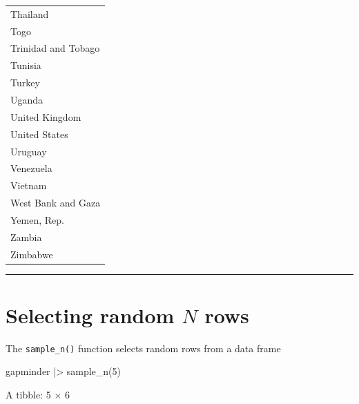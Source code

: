 \documentclass[
  letterpaper,
  DIV=11,
  numbers=noendperiod]{scrreprt}
\newenvironment{Shaded}{\begin{snugshade}}{\end{snugshade}}
\newcommand{\DecValTok}[1]{\textcolor[rgb]{0.68,0.00,0.00}{#1}}
\newcommand{\FunctionTok}[1]{\textcolor[rgb]{0.28,0.35,0.67}{#1}}
\newcommand{\NormalTok}[1]{\textcolor[rgb]{0.00,0.23,0.31}{#1}}
\newcommand{\SpecialCharTok}[1]{\textcolor[rgb]{0.37,0.37,0.37}{#1}}
\begin{document}
\begin{longtable}[]{@{}l@{}}
Thailand \\
Togo \\
Trinidad and Tobago \\
Tunisia \\
Turkey \\
Uganda \\
United Kingdom \\
United States \\
Uruguay \\
Venezuela \\
Vietnam \\
West Bank and Gaza \\
Yemen, Rep. \\
Zambia \\
Zimbabwe \\
\end{longtable}

\begin{center}\rule{0.5\linewidth}{0.5pt}\end{center}

\section{\texorpdfstring{Selecting random \(N\)
rows}{Selecting random N rows}}\label{selecting-random-n-rows}

The \texttt{sample\_n()} function selects random rows from a data frame

\begin{Shaded}
\begin{Highlighting}[]
\NormalTok{gapminder }\SpecialCharTok{|\textgreater{}} \FunctionTok{sample\_n}\NormalTok{(}\DecValTok{5}\NormalTok{)}
\end{Highlighting}
\end{Shaded}

A tibble: 5 × 6
\end{document}
